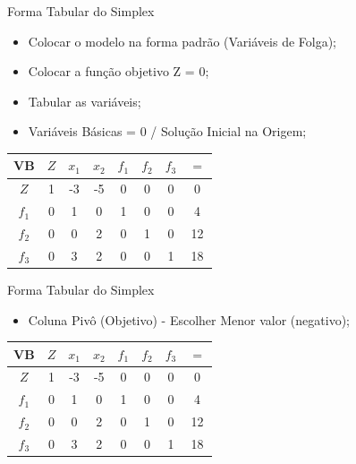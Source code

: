\documentclass{if-beamer}
\begin{document}
\begin{frame}{Forma Tabular do Simplex}

\begin{itemize}
    \item {} Colocar o modelo na forma padrão (Variáveis de Folga);
    \item {} Colocar a função objetivo Z = 0;
    \item {} Tabular as variáveis;
    \item {} Variáveis Básicas = 0 / Solução Inicial na Origem;
\end{itemize}

\begin{table}
    \centering
    \begin{tabular}{c|ccccccc}
    \hline
    VB    & $Z$ & $x_1$ & $x_2$ & $f_1$ & $f_2$ & $f_3$ & $=$  \\
    \hline
    $Z$   & 1   & -3    & -5    & 0     & 0     & 0     & 0    \\
    $f_1$ & 0   & 1     & 0     & 1     & 0     & 0     & 4    \\
    $f_2$ & 0   & 0     & 2     & 0     & 1     & 0     & 12   \\
    $f_3$ & 0   & 3     & 2     & 0     & 0     & 1     & 18   \\
    \hline
    \end{tabular}
\end{table}

\end{frame}


\begin{frame}{Forma Tabular do Simplex}

\begin{itemize}
    \item {} Coluna Pivô (Objetivo) - Escolher Menor valor (negativo);
\end{itemize}

\begin{table}
    \centering
    \begin{tabular}{c|ccccccc}
    \hline
    VB    & $Z$ & $x_1$ & $x_2$ & $f_1$ & $f_2$ & $f_3$ & $=$  \\
    \hline
    $Z$   & 1   & -3    & -5    & 0     & 0     & 0     & 0    \\
    $f_1$ & 0   & 1     & 0     & 1     & 0     & 0     & 4    \\
    $f_2$ & 0   & 0     & 2     & 0     & 1     & 0     & 12   \\
    $f_3$ & 0   & 3     & 2     & 0     & 0     & 1     & 18   \\
    \hline
    \end{tabular}
\end{table}

\end{frame}
\end{document}
